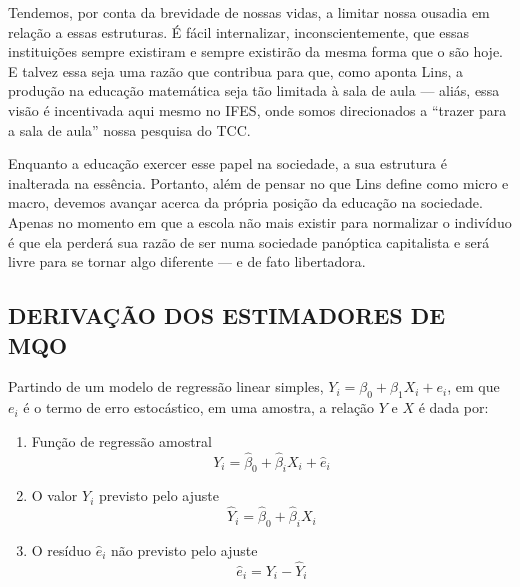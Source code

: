 \documentclass[
  12pt,
  letterpaper,
  DIV=11,
  numbers=noendperiod]{scrartcl}
\begin{document}
Tendemos, por conta da brevidade de nossas vidas, a limitar nossa
ousadia em relação a essas estruturas. É fácil internalizar,
inconscientemente, que essas instituições sempre existiram e sempre
existirão da mesma forma que o são hoje. E talvez essa seja uma razão
que contribua para que, como aponta Lins, a produção na educação
matemática seja tão limitada à sala de aula --- aliás, essa visão é
incentivada aqui mesmo no IFES, onde somos direcionados a ``trazer para
a sala de aula'' nossa pesquisa do TCC.

Enquanto a educação exercer esse papel na sociedade, a sua estrutura é
inalterada na essência. Portanto, além de pensar no que Lins define como
micro e macro, devemos avançar acerca da própria posição da educação na
sociedade. Apenas no momento em que a escola não mais existir para
normalizar o indivíduo é que ela perderá sua razão de ser numa sociedade
panóptica capitalista e será livre para se tornar algo diferente --- e
de fato libertadora.

\newpage

\hypertarget{derivauxe7uxe3o-dos-estimadores-de-mqo}{%
\subsection*{DERIVAÇÃO DOS ESTIMADORES DE
MQO}\label{derivauxe7uxe3o-dos-estimadores-de-mqo}}

Partindo de um modelo de regressão linear simples,
\(Y_i = \beta_0 + \beta_1X_i + e_i\), em que \(e_i\) é o termo de erro
estocástico, em uma amostra, a relação \(Y\) e \(X\) é dada por:

\begin{enumerate}
\def\labelenumi{\arabic{enumi}.}
\item
  Função de regressão amostral \begin{equation}
  Y_i = \hat{\beta}_0 + \hat{\beta}_iX_i + \hat{e}_i
  \end{equation}
\item
  O valor \(Y_i\) previsto pelo ajuste \begin{equation}
  \hat{Y}_i = \hat{\beta}_0 + \hat{\beta}_iX_i
  \end{equation}
\item
  O resíduo \(\hat{e}_i\) não previsto pelo ajuste \begin{equation}
  \hat{e}_i = Y_i - \hat{Y}_i
  \end{equation}
\end{enumerate}
\end{document}
